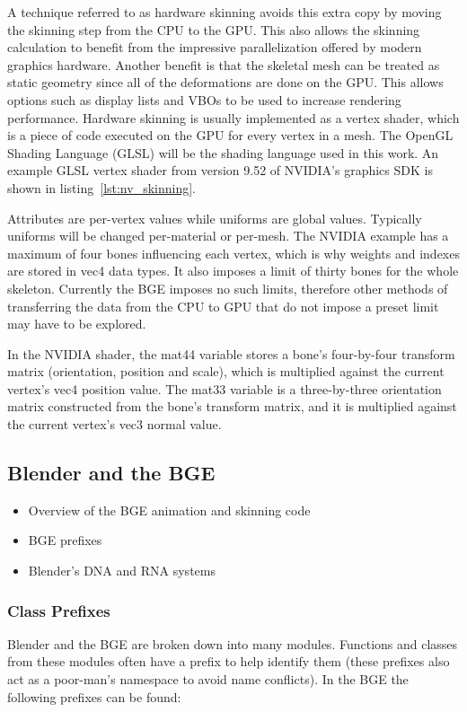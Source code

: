 A technique referred to as hardware skinning avoids this extra copy by moving the skinning step from the CPU to the GPU. This also allows the skinning calculation to benefit from the impressive parallelization offered by modern graphics hardware. Another benefit is that the skeletal mesh can be treated as static geometry since all of the deformations are done on the GPU. This allows options such as display lists and VBOs to be used to increase rendering performance. Hardware skinning is usually implemented as a vertex shader, which is a piece of code executed on the GPU for every vertex in a mesh. The OpenGL Shading Language (GLSL) will be the shading language used in this work. An example GLSL vertex shader from version 9.52 of NVIDIA's graphics SDK\cite{nvidiasdk} is shown in listing~\ref{lst:nv_skinning}.


Attributes are per-vertex values while uniforms are global values. Typically uniforms will be changed per-material or per-mesh. The NVIDIA example has a maximum of four bones influencing each vertex, which is why weights and indexes are stored in vec4 data types. It also imposes a limit of thirty bones for the whole skeleton. Currently the BGE imposes no such limits, therefore other methods of transferring the data from the CPU to GPU that do not impose a preset limit may have to be explored.

In the NVIDIA shader, the mat44 variable stores a bone's four-by-four transform matrix (orientation, position and scale), which is multiplied against the current vertex's vec4 position value. The mat33 variable is a three-by-three orientation matrix constructed from the bone's transform matrix, and it is multiplied against the current vertex's vec3 normal value.

\subsection{Blender and the BGE}
\begin{itemize}
 \item Overview of the BGE animation and skinning code
 \item BGE prefixes
 \item Blender's DNA and RNA systems
\end{itemize}

\subsubsection{Class Prefixes}
Blender and the BGE are broken down into many modules. Functions and classes from these modules often have a prefix to help identify them (these prefixes also act as a poor-man's namespace to avoid name conflicts). In the BGE the following prefixes can be found:


